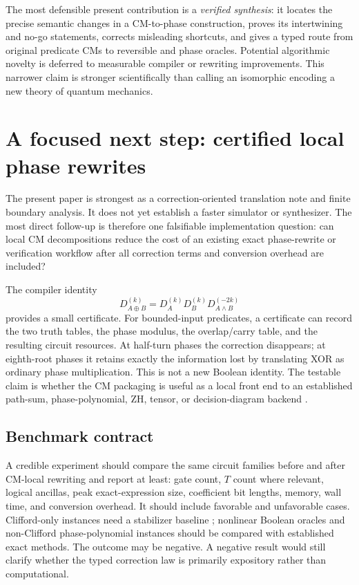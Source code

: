 The most defensible present contribution is a \emph{verified synthesis}: it locates the precise semantic changes in a CM-to-phase construction, proves its intertwining and no-go statements, corrects misleading shortcuts, and gives a typed route from original predicate CMs to reversible and phase oracles. Potential algorithmic novelty is deferred to measurable compiler or rewriting improvements. This narrower claim is stronger scientifically than calling an isomorphic encoding a new theory of quantum mechanics.

\section{A focused next step: certified local phase rewrites}\label{sec:applications}
The present paper is strongest as a correction-oriented translation note and finite boundary analysis.  It does not yet establish a faster simulator or synthesizer.  The most direct follow-up is therefore one falsifiable implementation question: can local CM decompositions reduce the cost of an existing exact phase-rewrite or verification workflow after all correction terms and conversion overhead are included?

The compiler identity
\begin{equation}
 D_{A\oplus B}^{(k)}=D_A^{(k)}D_B^{(k)}D_{A\land B}^{(-2k)}
\end{equation}
provides a small certificate.  For bounded-input predicates, a certificate can record the two truth tables, the phase modulus, the overlap/carry table, and the resulting circuit resources.  At half-turn phases the correction disappears; at eighth-root phases it retains exactly the information lost by translating XOR as ordinary phase multiplication.  This is not a new Boolean identity.  The testable claim is whether the CM packaging is useful as a local front end to an established path-sum, phase-polynomial, ZH, tensor, or decision-diagram backend \cite{amy2019,amy2023,zh,markov,tdd,mei}.

\subsection{Benchmark contract}
A credible experiment should compare the same circuit families before and after CM-local rewriting and report at least: gate count, $T$ count where relevant, logical ancillas, peak exact-expression size, coefficient bit lengths, memory, wall time, and conversion overhead.  It should include favorable and unfavorable cases.  Clifford-only instances need a stabilizer baseline \cite{aaronson}; nonlinear Boolean oracles and non-Clifford phase-polynomial instances should be compared with established exact methods.  The outcome may be negative.  A negative result would still clarify whether the typed correction law is primarily expository rather than computational.

